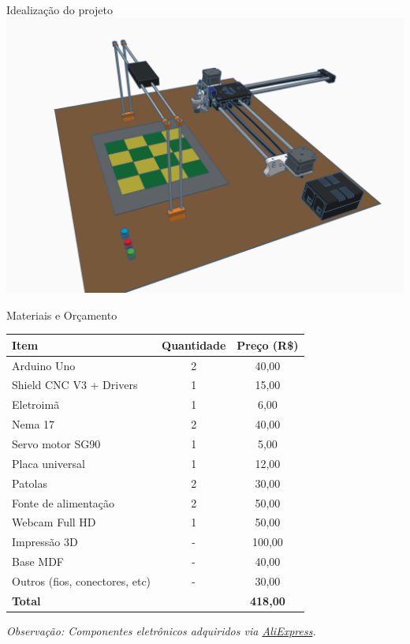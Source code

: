 \documentclass{beamer}
\begin{document}
\begin{frame}[plain]{Idealização do projeto}
  \centering
\includegraphics[width=0.9\paperwidth,keepaspectratio]{images/modelo3d.png}
\end{frame}

\begin{frame}{Materiais e Orçamento}
  \begin{tabular}{|l|c|c|}
    \hline
    \textbf{Item} & \textbf{Quantidade} & \textbf{Preço (R\$)} \\
    \hline
    Arduino Uno & 2 & 40,00 \\
    Shield CNC V3 + Drivers & 1 & 15,00 \\
    Eletroimã & 1 & 6,00 \\
    Nema 17 & 2 & 40,00 \\
    Servo motor SG90 & 1 & 5,00 \\
    Placa universal & 1 & 12,00 \\
    Patolas & 2 & 30,00 \\
    Fonte de alimentação & 2 & 50,00 \\
    Webcam Full HD & 1 & 50,00 \\
    Impressão 3D & - & 100,00 \\
    Base MDF & - & 40,00 \\
    Outros (fios, conectores, etc) & - & 30,00 \\
    \hline
    \textbf{Total} & & \textbf{418,00} \\
    \hline
  \end{tabular}
   \vspace{0.5em}

  {\scriptsize\textit{Observação: Componentes eletrônicos adquiridos via \href{https://pt.aliexpress.com}{AliExpress}.}}
\end{frame}
\end{document}
